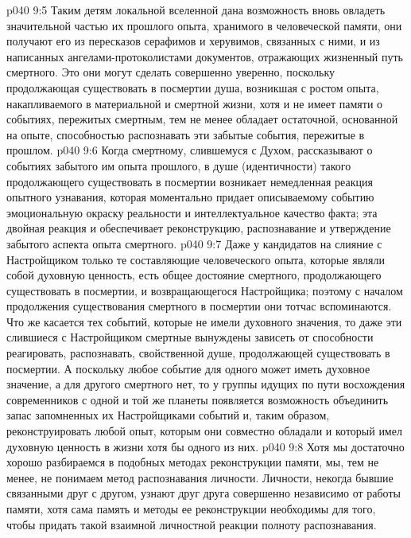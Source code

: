 \vs p040 9:5 Таким детям локальной вселенной дана возможность вновь овладеть значительной частью их прошлого опыта, хранимого в человеческой памяти, они получают его из пересказов серафимов и херувимов, связанных с ними, и из написанных ангелами\hyp{}протоколистами документов, отражающих жизненный путь смертного. Это они могут сделать совершенно уверенно, поскольку продолжающая существовать в посмертии душа, возникшая с ростом опыта, накапливаемого в материальной и смертной жизни, хотя и не имеет памяти о событиях, пережитых смертным, тем не менее обладает остаточной, основанной на опыте, способностью распознавать эти забытые события, пережитые в прошлом.
\vs p040 9:6 Когда смертному, слившемуся с Духом, рассказывают о событиях забытого им опыта прошлого, в душе (идентичности) такого продолжающего существовать в посмертии возникает немедленная реакция опытного узнавания, которая моментально придает описываемому событию эмоциональную окраску реальности и интеллектуальное качество факта; эта двойная реакция и обеспечивает реконструкцию, распознавание и утверждение забытого аспекта опыта смертного.
\vs p040 9:7 Даже у кандидатов на слияние с Настройщиком только те составляющие человеческого опыта, которые являли собой духовную ценность, есть общее достояние смертного, продолжающего существовать в посмертии, и возвращающегося Настройщика; поэтому с началом продолжения существования смертного в посмертии они тотчас вспоминаются. Что же касается тех событий, которые не имели духовного значения, то даже эти слившиеся с Настройщиком смертные вынуждены зависеть от способности реагировать, распознавать, свойственной душе, продолжающей существовать в посмертии. А поскольку любое событие для одного может иметь духовное значение, а для другого смертного нет, то у группы идущих по пути восхождения современников с одной и той же планеты появляется возможность объединить запас запомненных их Настройщиками событий и, таким образом, реконструировать любой опыт, которым они совместно обладали и который имел духовную ценность в жизни хотя бы одного из них.
\vs p040 9:8 \pc Хотя мы достаточно хорошо разбираемся в подобных методах реконструкции памяти, мы, тем не менее, не понимаем метод распознавания личности. Личности, некогда бывшие связанными друг с другом, узнают друг друга совершенно независимо от работы памяти, хотя сама память и методы ее реконструкции необходимы для того, чтобы придать такой взаимной личностной реакции полноту распознавания.
